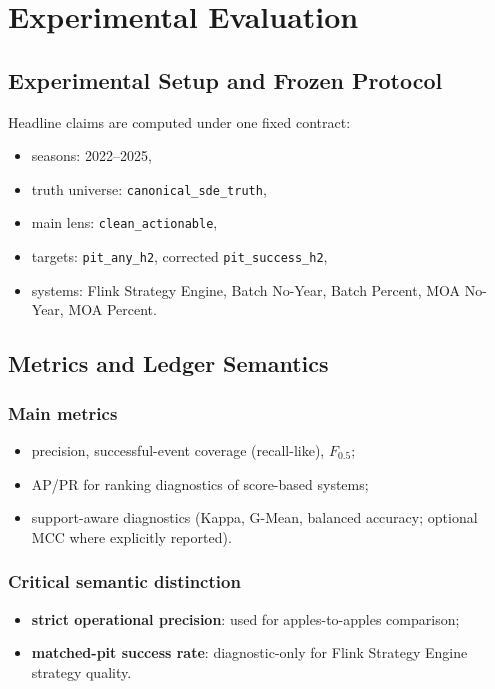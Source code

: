 \chapter{Experimental Evaluation}
\label{ch:experimental_evaluation}

\section{Experimental Setup and Frozen Protocol}

Headline claims are computed under one fixed contract:
\begin{itemize}
    \item seasons: 2022--2025,
    \item truth universe: \texttt{canonical\_sde\_truth},
    \item main lens: \texttt{clean\_actionable},
    \item targets: \texttt{pit\_any\_h2}, corrected \texttt{pit\_success\_h2},
    \item systems: Flink Strategy Engine, Batch No-Year, Batch Percent, MOA No-Year, MOA Percent.
\end{itemize}


\section{Metrics and Ledger Semantics}

\subsection{Main metrics}
\begin{itemize}
    \item precision, successful-event coverage (recall-like), $F_{0.5}$;
    \item AP/PR for ranking diagnostics of score-based systems;
    \item support-aware diagnostics (Kappa, G-Mean, balanced accuracy; optional MCC where explicitly reported).
\end{itemize}

\subsection{Critical semantic distinction}
\begin{itemize}
    \item \textbf{strict operational precision}: used for apples-to-apples comparison;
    \item \textbf{matched-pit success rate}: diagnostic-only for Flink Strategy Engine strategy quality.
\end{itemize}

